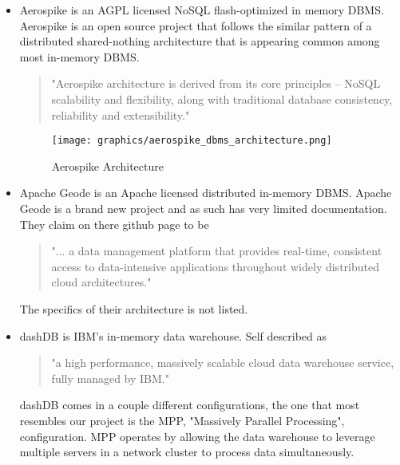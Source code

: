 \documentclass[letterpaper, 12pt]{article}
\begin{document}
\begin{itemize}
  \par\vspace{\baselineskip}
  \item Aerospike is an AGPL licensed NoSQL flash-optimized in memory
  DBMS. Aerospike is an open source project that follows the similar pattern of
  a distributed shared-nothing architecture that is appearing common among most
  in-memory DBMS.
  \begin{quote}
  "Aerospike architecture is derived from its core principles – NoSQL scalability and
  flexibility, along with traditional database consistency, reliability and
  extensibility."
  \cite{aerospike}
  \end{quote}
  \par\vspace{\baselineskip}
  \begin{figure}
    \centering
    \texttt{[image: graphics/aerospike\_dbms\_architecture.png]}
    \caption{Aerospike Architecture}
  \end{figure}
  \cite{aerospike}
  \par\vspace{\baselineskip}
  \item Apache Geode is an Apache licensed distributed in-memory DBMS. Apache Geode is
  a brand new project and as such has very limited documentation. They claim on there
  github page to be
  \begin{quote}
  "... a data management platform that provides real-time, consistent access to
  data-intensive applications throughout widely distributed cloud architectures."
  \cite{aerospike}
  \end{quote}
  The specifics of their architecture is not listed.
  \par\vspace{\baselineskip}
  \item dashDB is IBM's in-memory data warehouse. Self described as
  \begin{quote}
  "a high performance, massively scalable cloud data warehouse service,
  fully managed by IBM." \cite{dashDB}
  \end{quote}
  dashDB comes in a couple different configurations, the one that most resembles
  our project is the MPP, "Massively Parallel Processing", configuration.
  MPP operates by allowing the data warehouse to leverage multiple servers
  in a network cluster to process data simultaneously.
  \par\vspace{\baselineskip}

\end{itemize}
\end{document}
